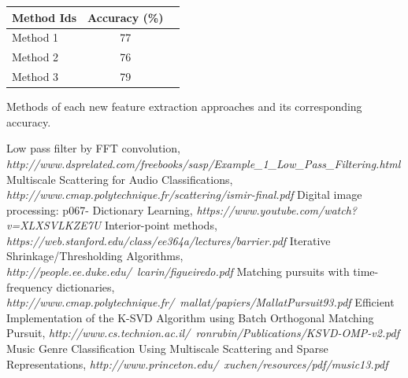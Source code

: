 \documentclass[final]{siamltexmm}
\begin{document}
\begin{center}
  \begin{tabular}{ l || c | r }
    \hline
    Method Ids & Accuracy (\%) \\ \hline \hline
    Method 1 & 77 \\ \hline
    Method 2 & 76 \\ \hline
    Method 3 & 79 \\ \hline
    \hline
  \end{tabular}
  \begin{tablenotes}
    \small
    \item Methods of each new feature extraction approaches and its corresponding accuracy.
  \end{tablenotes}
\end{center}

\begin{thebibliography}{10}
 {\sc Low pass filter by FFT convolution}, {\em http://www.dsprelated.com/freebooks/sasp/Example\_1\_Low\_Pass\_Filtering.html}
 {\sc Multiscale Scattering for Audio Classifications}, {\em http://www.cmap.polytechnique.fr/scattering/ismir-final.pdf}
 {\sc Digital image processing: p067- Dictionary Learning}, {\em https://www.youtube.com/watch?v=XLXSVLKZE7U}
 {\sc Interior-point methods}, {\em https://web.stanford.edu/class/ee364a/lectures/barrier.pdf}
 {\sc Iterative Shrinkage/Thresholding Algorithms}, {\em http://people.ee.duke.edu/~lcarin/figueiredo.pdf}
 {\sc Matching pursuits with time-frequency dictionaries}, {\em http://www.cmap.polytechnique.fr/~mallat/papiers/MallatPursuit93.pdf}
 {\sc Efficient Implementation of the K-SVD Algorithm using Batch Orthogonal Matching Pursuit}, {\em http://www.cs.technion.ac.il/~ronrubin/Publications/KSVD-OMP-v2.pdf}
 {\sc Music Genre Classification Using Multiscale Scattering and Sparse Representations}, {\em http://www.princeton.edu/~xuchen/resources/pdf/music13.pdf}
\end{thebibliography}
\end{document}
